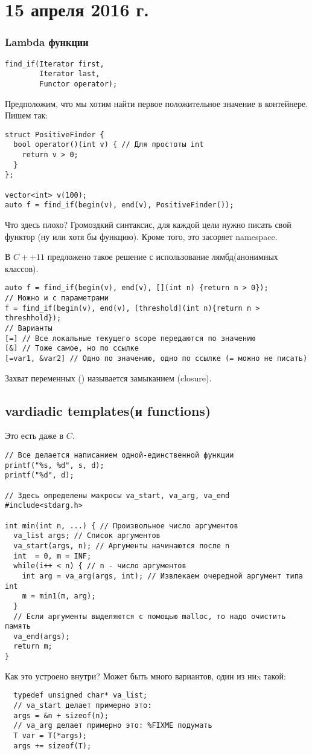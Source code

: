 \section{15 апреля 2016 г.}

\subsubsection{Lambda функции}
\begin{verbatim}
find_if(Iterator first,
        Iterator last,
        Functor operator);
\end{verbatim}
Предположим, что мы хотим найти первое положительное значение в контейнере. Пишем так:
\begin{verbatim}
struct PositiveFinder {
  bool operator()(int v) { // Для простоты int
    return v > 0;
  }
};

vector<int> v(100);
auto f = find_if(begin(v), end(v), PositiveFinder());
\end{verbatim}
Что здесь плохо? Громоздкий синтаксис, для каждой цели нужно писать свой функтор (ну или хотя бы функцию). Кроме того, это засоряет namespace.

В $C++11$ предложено такое решение с использование лямбд(анонимных классов).
\begin{verbatim}
auto f = find_if(begin(v), end(v), [](int n) {return n > 0});
// Можно и с параметрами
f = find_if(begin(v), end(v), [threshold](int n){return n > threshhold});
// Варианты
[=] // Все локальные текущего scope передаются по значению
[&] // Тоже самое, но по ссылке
[=var1, &var2] // Одно по значению, одно по ссылке (= можно не писать)
\end{verbatim}
Захват переменных (\cc{[]}) называется замыканием (closure).

\subsection{vardiadic templates(и functions)}
Это есть даже в $C$.
\begin{verbatim}
// Все делается написанием одной-единственной функции
printf("%s, %d", s, d);
printf("%d", d);

// Здесь определены макросы va_start, va_arg, va_end
#include<stdarg.h>

int min(int n, ...) { // Произвольное число аргументов
  va_list args; // Список аргументов
  va_start(args, n); // Аргументы начинаются после n
  int  = 0, m = INF;
  while(i++ < n) { // n - число аргументов
    int arg = va_arg(args, int); // Извлекаем очередной аргумент типа int
    m = min1(m, arg);
  }
  // Если аргументы выделяются с помощью malloc, то надо очистить память
  va_end(args);
  return m;
}
\end{verbatim}
Как это устроено внутри? Может быть много вариантов, один из ниx такой:
\begin{verbatim}
  typedef unsigned char* va_list;
  // va_start делает примерно это:
  args = &n + sizeof(n);
  // va_arg делает примерно это: %FIXME подумать
  T var = T(*args);
  args += sizeof(T);
\end{verbatim}

